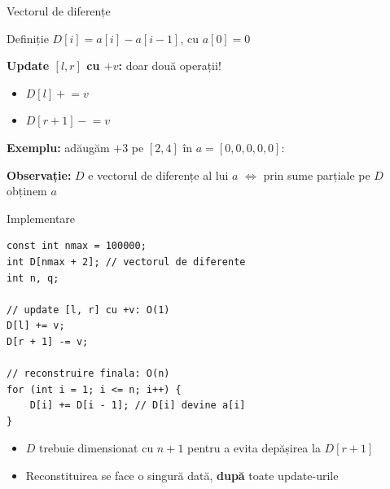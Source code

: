 ﻿\documentclass{beamer}
\begin{document}
\begin{frame}{Vectorul de diferențe}
  \begin{block}{Definiție}
    $D[i] = a[i] - a[i-1]$, cu $a[0] = 0$
  \end{block}

  \textbf{Update $[l, r]$ cu $+v$:} doar două operații!
  \begin{itemize}
    \item $D[l] \mathrel{+}= v$
    \item $D[r+1] \mathrel{-}= v$
  \end{itemize}

  \smallskip
  \textbf{Exemplu:} adăugăm $+3$ pe $[2, 4]$ în $a = [0,0,0,0,0]$:

  \begin{center}
  \end{center}

  \textbf{Observație:} $D$ e vectorul de diferențe al lui $a$ $\Longleftrightarrow$ prin sume parțiale pe $D$ obținem $a$
\end{frame}

\begin{frame}[fragile]{Implementare}
  \begin{lstlisting}
const int nmax = 100000;
int D[nmax + 2]; // vectorul de diferente
int n, q;

// update [l, r] cu +v: O(1)
D[l] += v;
D[r + 1] -= v;

// reconstruire finala: O(n)
for (int i = 1; i <= n; i++) {
    D[i] += D[i - 1]; // D[i] devine a[i]
}
  \end{lstlisting}

  \begin{itemize}
    \item $D$ trebuie dimensionat cu $n+1$ pentru a evita depășirea la $D[r+1]$
    \item Reconstituirea se face o singură dată, \textbf{după} toate update-urile
  \end{itemize}
\end{frame}
\end{document}
